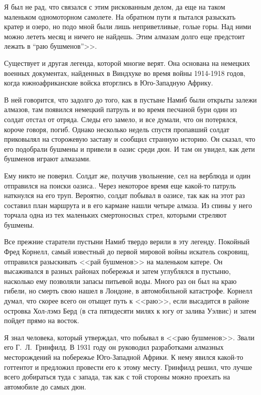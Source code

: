 \documentclass[12pt,a4paper,twoside,openany,svgnames]{memoir}
\begin{document}
Я был не рад, что связался с этим рискованным делом, да еще на таком маленьком одномоторном самолете. На обратном пути я пытался разыскать кратер и озеро, но подо мной были лишь неприветливые, голые горы. Над ними можно лететь месяц и ничего не найдешь. Этим алмазам долго еще предстоит лежать в ``раю бушменов''>>.

Существует и другая легенда, которой многие верят. Она основана на немецких военных документах, найденных в Виндхуке во время войны 1914-1918 годов, когда южноафриканские войска вторглись в Юго-Западную Африку.

В ней говорится, что задолго до того, как в пустыне Намиб были открыты залежи алмазов, там появился немецкий патруль и во время песчаной бури один из солдат отстал от отряда. Следы его замело, и все думали, что он потерялся, короче говоря, погиб. Однако несколько недель спустя пропавший солдат приковылял на сторожевую заставу и сообщил странную историю. Он сказал, что его подобрали бушмены и привели в оазис среди дюн. И там он увидел, как дети бушменов играют алмазами.

Ему никто не поверил. Солдат же, получив увольнение, сел на верблюда и один отправился на поиски оазиса.. Через некоторое время еще какой-то патруль наткнулся на его труп. Вероятно, солдат побывал в оазисе, так как на этот раз составил план маршрута и в его кармане нашли четыре алмаза. Из спины у него торчала одна из тех маленьких смертоносных стрел, которыми стреляют бушмены.

Все прежние старатели пустыни Намиб твердо верили в эту легенду. Покойный Фред Корнелл, самый известный до первой мировой войны искатель сокровищ, отправился разыскивать <<рай бушменов>> на маленьком катере. Он высаживался в разных районах побережья и затем углублялся в пустыню, насколько ему позволяли запасы питьевой воды. Много раз он был на краю гибели, но смерть свою нашел в Лондоне, в автомобильной катастрофе. Корнелл думал, что скорее всего он отыщет путь к <<раю>>, если высадится в районе островка Хол-лэмз Берд (в ста пятидесяти милях к югу от залива Уэлвис) и затем пойдет прямо на восток.

Я знал человека, который утверждал, что побывал в <<раю бушменов>>. Звали его Г.~Л.~Гринфилд. В 1931 году он руководил разработками алмазных месторождений на побережье Юго-Западной Африки. К нему явился какой-то готтентот и предложил провести его к этому месту. Гринфилд решил, что лучше всего добираться туда с запада, так как с той стороны можно проехать на автомобиле до самых дюн.
\end{document}
